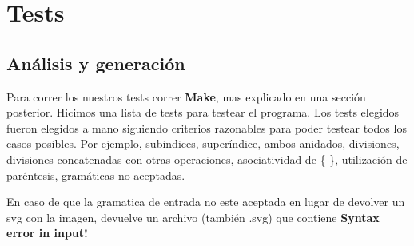 \section{Tests}

\subsection{An\'alisis y generaci\'on}
Para correr los nuestros tests correr \textbf{Make}, mas explicado en una secci\'on posterior. 
Hicimos una lista de tests para testear el programa. Los tests elegidos fueron elegidos a mano siguiendo criterios razonables para poder testear todos los casos posibles. Por ejemplo, subindices, super\'indice, ambos anidados, divisiones, divisiones concatenadas con otras operaciones, asociatividad de \{ \}, utilizaci\'on de par\'entesis, gram\'aticas no aceptadas.

En caso de que la gramatica de entrada no este aceptada en lugar de devolver un svg con la imagen, devuelve un archivo (tambi\'en .svg) que contiene \textbf{Syntax error in input!}

